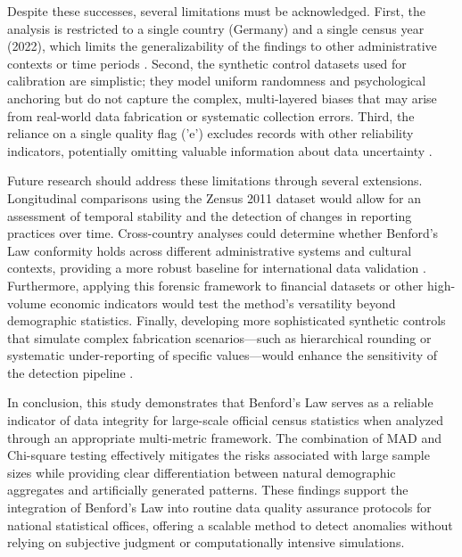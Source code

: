 \documentclass[11pt,a4paper]{article}
\begin{document}
Despite these successes, several limitations must be acknowledged. First, the analysis is restricted to a single country (Germany) and a single census year (2022), which limits the generalizability of the findings to other administrative contexts or time periods \cite{Shalini2023DataQA}. Second, the synthetic control datasets used for calibration are simplistic; they model uniform randomness and psychological anchoring but do not capture the complex, multi-layered biases that may arise from real-world data fabrication or systematic collection errors. Third, the reliance on a single quality flag ('e') excludes records with other reliability indicators, potentially omitting valuable information about data uncertainty \cite{Silva2024ANA}.

Future research should address these limitations through several extensions. Longitudinal comparisons using the Zensus 2011 dataset would allow for an assessment of temporal stability and the detection of changes in reporting practices over time. Cross-country analyses could determine whether Benford's Law conformity holds across different administrative systems and cultural contexts, providing a more robust baseline for international data validation \cite{Ivanova2025BenfordsLA}. Furthermore, applying this forensic framework to financial datasets or other high-volume economic indicators would test the method's versatility beyond demographic statistics. Finally, developing more sophisticated synthetic controls that simulate complex fabrication scenarios---such as hierarchical rounding or systematic under-reporting of specific values---would enhance the sensitivity of the detection pipeline \cite{Schumm2023CanRS}.

In conclusion, this study demonstrates that Benford's Law serves as a reliable indicator of data integrity for large-scale official census statistics when analyzed through an appropriate multi-metric framework. The combination of MAD and Chi-square testing effectively mitigates the risks associated with large sample sizes while providing clear differentiation between natural demographic aggregates and artificially generated patterns. These findings support the integration of Benford's Law into routine data quality assurance protocols for national statistical offices, offering a scalable method to detect anomalies without relying on subjective judgment or computationally intensive simulations.
\end{document}
